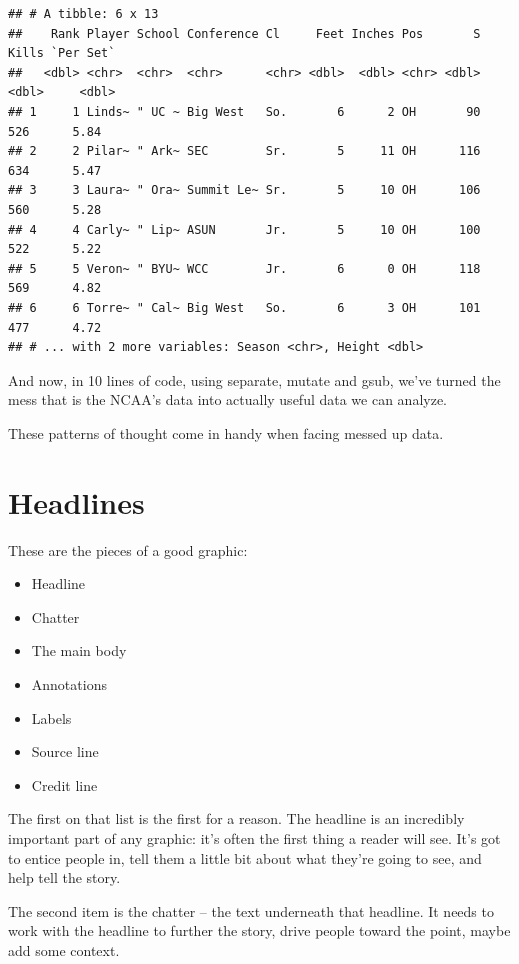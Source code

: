 \documentclass[
]{book}
\providecommand{\tightlist}{%
  \setlength{\itemsep}{0pt}\setlength{\parskip}{0pt}}
\begin{document}
\begin{verbatim}
## # A tibble: 6 x 13
##    Rank Player School Conference Cl     Feet Inches Pos       S Kills `Per Set`
##   <dbl> <chr>  <chr>  <chr>      <chr> <dbl>  <dbl> <chr> <dbl> <dbl>     <dbl>
## 1     1 Linds~ " UC ~ Big West   So.       6      2 OH       90   526      5.84
## 2     2 Pilar~ " Ark~ SEC        Sr.       5     11 OH      116   634      5.47
## 3     3 Laura~ " Ora~ Summit Le~ Sr.       5     10 OH      106   560      5.28
## 4     4 Carly~ " Lip~ ASUN       Jr.       5     10 OH      100   522      5.22
## 5     5 Veron~ " BYU~ WCC        Jr.       6      0 OH      118   569      4.82
## 6     6 Torre~ " Cal~ Big West   So.       6      3 OH      101   477      4.72
## # ... with 2 more variables: Season <chr>, Height <dbl>
\end{verbatim}

And now, in 10 lines of code, using separate, mutate and gsub, we've turned the mess that is the NCAA's data into actually useful data we can analyze.

These patterns of thought come in handy when facing messed up data.

\hypertarget{headlines}{%
\chapter{Headlines}\label{headlines}}

These are the pieces of a good graphic:

\begin{itemize}
\tightlist
\item
  Headline
\item
  Chatter
\item
  The main body
\item
  Annotations
\item
  Labels
\item
  Source line
\item
  Credit line
\end{itemize}

The first on that list is the first for a reason. The headline is an incredibly important part of any graphic: it's often the first thing a reader will see. It's got to entice people in, tell them a little bit about what they're going to see, and help tell the story.

The second item is the chatter -- the text underneath that headline. It needs to work with the headline to further the story, drive people toward the point, maybe add some context.
\end{document}
